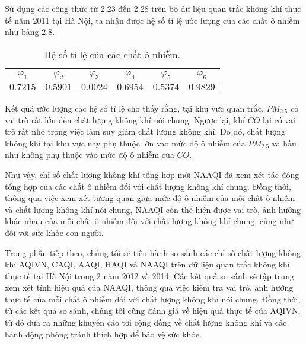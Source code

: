 \documentclass[14pt]{extreport}
\theoremstyle{definition}
\theoremstyle{plain}
\theoremstyle{remark}
\begin{document}
Sử dụng các công thức từ 2.23 đến 2.28 trên bộ dữ liệu quan trắc không khí thực tế năm 2011 tại Hà Nội, ta nhận được hệ số tỉ lệ ước lượng của các chất ô nhiễm như bảng 2.8.

\begin{table}
\begin{tabular}{|c|c|c|c|c|c|} 
 \hline
 \hspace{0.8cm}$\varphi_1$ \hspace{0.8cm} & \hspace{0.8cm}$\varphi_2$\hspace{0.8cm} & \hspace{0.8cm}$\varphi_3$\hspace{0.8cm} & \hspace{0.8cm}$\varphi_4$\hspace{0.8cm} & \hspace{0.8cm}$\varphi_5$\hspace{0.8cm} & \hspace{0.8cm}$\varphi_6$ \hspace*{0.8cm}\\\hline \hline
 $0.7215$	&	$0.5901$		&	$0.0024$	&	$0.6954$		&	$0.5374$		&	$0.9829$ \\
\hline
\end{tabular}
\caption{Hệ số tỉ lệ của các chất ô nhiễm.}
\end{table}

Kết quả ước lượng các hệ số tỉ lệ cho thấy rằng, tại khu vực quan trắc, $PM_{2.5}$ có vai trò rất lớn đến chất lượng không khí nói chung. Ngược lại, khí $CO$ lại có vai trò rất nhỏ trong việc làm suy giảm chất lượng không khí. Do đó, chất lượng không khí tại khu vực này phụ thuộc lớn vào mức độ ô nhiễm của $PM_{2.5}$ và hầu như không phụ thuộc vào mức độ ô nhiễm của $CO$.

Như vậy, chỉ số chất lượng không khí tổng hợp mới NAAQI đã xem xét tác động tổng hợp của các chất ô nhiễm đối với chất lượng không khí chung. Đồng thời, thông qua việc xem xét tương quan giữa mức độ ô nhiễm của mỗi chất ô nhiễm và chất lượng không khí nói chung, NAAQI còn thể hiện được vai trò, ảnh hưởng khác nhau của mỗi chất ô nhiễm đối với chất lượng không khí chung, cũng như đối với sức khỏe con người.

Trong phần tiếp theo, chúng tôi sẽ tiến hành so sánh các chỉ số chất lượng không khí AQIVN, CAQI, AAQI, HAQI và NAAQI trên dữ liệu quan trắc không khí thực tế tại Hà Nội trong 2 năm 2012 và 2014. Các kết quả so sánh sẽ tập trung xem xét tính hiệu quả của NAAQI, thông qua việc kiểm tra vai trò, ảnh hưởng thực tế của mỗi chất ô nhiễm đối với chất lượng không khí nói chung. Đồng thời, từ các kết quả so sánh, chúng tôi cũng đánh giá về hiệu quả thực tế của AQIVN, từ đó đưa ra những khuyến cáo tới cộng đồng về chất lượng không khí và các hành động phòng tránh thích hợp để bảo vệ sức khỏe.
\end{document}
